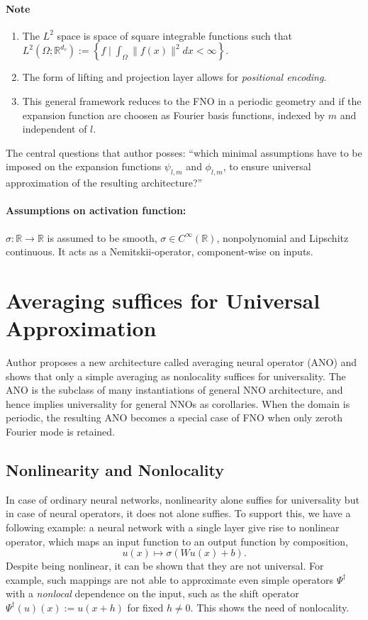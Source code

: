 \documentclass[reqno,9pt]{amsart}
\theoremstyle{plain}
\theoremstyle{definition}
\newcommand{\bb}[1]{\mathbb{#1}}
\begin{document}
\paragraph{\bf Note}
\begin{enumerate}
    \item The $L^2$ space is space of square integrable functions such that $L^2(\Omega;\bb R^{d_c}) := \left\{f\mid \int_{\Omega} \|f(x)\|^2 dx < \infty \right\}$.
    \item The form of lifting and projection layer allows for {\it positional encoding}.
    \item This general framework reduces to the FNO in a periodic geometry and if the expansion function are choosen as Fourier basis functions, indexed by $m$ and independent of $l$.
\end{enumerate} 
The central questions that author posses: ``which minimal assumptions have to be imposed on the expansion functions $\psi_{l,m}$ and $\phi_{l,m}$, to ensure universal approximation of the resulting architecture?''
\paragraph{\bf Assumptions on activation function:}$\sigma :\bb R \to \bb R$ is assumed to be smooth, $\sigma \in C^{\infty}(\bb R)$, nonpolynomial and Lipschitz continuous. It acts as a Nemitskii-operator, component-wise on inputs.

\section{\bf \large Averaging suffices for Universal Approximation}
\noindent Author proposes a new architecture called averaging neural operator (ANO) and shows that only a simple averaging as nonlocality suffices for universality. The ANO is the subclass of many instantiations of general NNO architecture, and hence implies universality for general NNOs as corollaries.  
\noindent When the domain is periodic, the resulting ANO becomes a special case of FNO when only zeroth Fourier mode is retained.

\subsection{\bf Nonlinearity and Nonlocality}
In case of ordinary neural networks, nonlinearity alone suffies for universality but in case of neural operators, it does not alone suffies. To support this, we have a following example: a neural network with a single layer give rise to nonlinear operator, which maps an input function to an output function by composition, 
$$ u(x) \mapsto \sigma(Wu(x) + b).$$
Despite being nonlinear, it can be shown that they are not universal. For example, such mappings are not able to approximate even simple operators $\Psi^\dag$ with a {\it nonlocal} dependence on the input, such as the shift operator $\Psi^\dag(u)(x) := u(x+h)$ for fixed $h \neq 0$. This shows the need of nonlocality.
\end{document}

